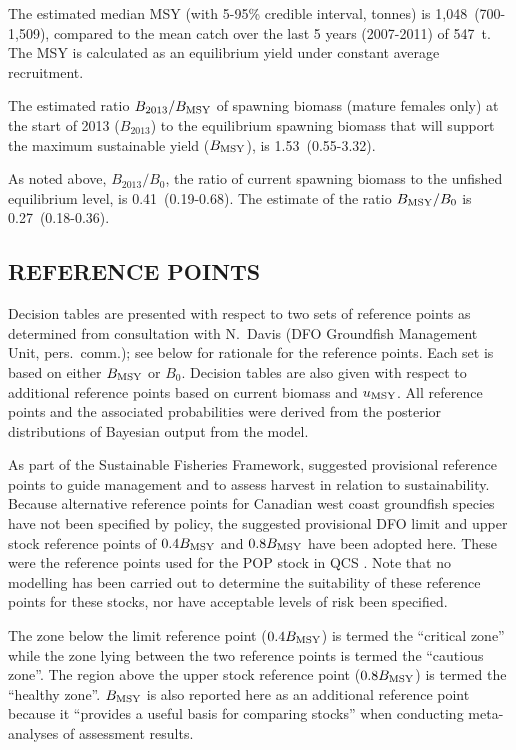 The estimated median MSY (with 5-95\% credible interval, tonnes) is 1,048~(700-1,509), compared to the mean catch over the last 5 years (2007-2011) of 547~t. The MSY is calculated as an equilibrium yield under constant average recruitment. 

The estimated ratio $B_{2013}/B_\mathrm{MSY}$ of spawning biomass (mature females only) at the start of 2013 ($B_{2013}$) to the equilibrium spawning biomass that will support the maximum sustainable yield ($B_\mathrm{MSY}$), is 1.53~(0.55-3.32). 

As noted above, $B_{2013}/B_0$, the ratio of current spawning biomass to the unfished equilibrium level, is 0.41~(0.19-0.68). The estimate of the ratio $B_\mathrm{MSY} / B_0$ is 0.27~(0.18-0.36).

\subsection{REFERENCE POINTS}

Decision tables are presented with respect to two sets of reference points as determined from consultation with N.~Davis (DFO Groundfish Management Unit, pers.~comm.); see below for rationale for the reference points. Each set is based on either $B_\mathrm{MSY}$ or $B_0$. Decision tables are also given with respect to additional reference points based on current biomass and $u_\mathrm{MSY}$. All reference points and the associated probabilities were derived from the posterior distributions of Bayesian output from the model.

As part of the Sustainable Fisheries Framework, suggested provisional reference points to guide management and to assess harvest in relation to sustainability. Because alternative reference points for Canadian west coast groundfish species have not been specified by policy, the suggested provisional DFO limit and upper stock reference points of $0.4 B_\mathrm{MSY}$ and $0.8 B_\mathrm{MSY}$ have been adopted here. These were the reference points used for the POP stock in QCS . Note that no modelling has been carried out to determine the suitability of these reference points for these stocks, nor have acceptable levels of risk been specified.

The zone below the limit reference point ($0.4 B_\mathrm{MSY}$) is termed the ``critical zone'' while the zone lying between the two reference points is termed the ``cautious zone''.  The region above the upper stock reference point ($0.8 B_\mathrm{MSY}$) is termed the ``healthy zone''.  $B_\mathrm{MSY}$ is also reported here as an additional reference point because it ``provides a useful basis for comparing stocks'' when conducting meta-analyses of assessment results. 

